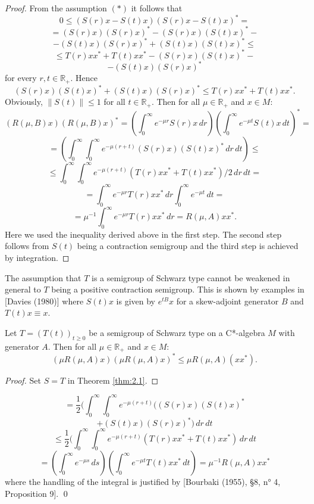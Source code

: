 \begin{proof}
From the assumption $ (*) $ it follows that
\[
0 \leq (S(r)x - S(t)x)(S(r)x - S(t)x)^* =
\]
\[
= (S(r)x)(S(r)x)^* - (S(r)x)(S(t)x)^* -
\]
\[
- (S(t)x)(S(r)x)^* + (S(t)x)(S(t)x)^* \leq
\]
\[
\leq T(r)xx^* + T(t)xx^* - (S(r)x)(S(t)x)^* -
\]
\[
- (S(t)x)(S(r)x)^*
\]
for every $ r,t \in \mathbb{R}_+ $.
Hence
\[
(S(r)x)(S(t)x)^* + (S(t)x)(S(r)x)^* \leq T(r)xx^* + T(t)xx^*.
\]
Obviously, $ \|S(t)\| \leq 1 $ for all $ t \in \mathbb{R}_+ $.
Then for all $ \mu \in \mathbb{R}_+ $ and $ x \in M $:
\[
(R(\mu,B)x)(R(\mu,B)x)^* = (\int_0^\infty e^{-\mu r}S(r)x \, dr)(\int_0^\infty e^{-\mu t}S(t)x \, dt)^* =
\]
\[
= (\int_0^\infty \int_0^\infty e^{-\mu(r+t)} (S(r)x)(S(t)x)^* \, dr \, dt) \leq
\]
\[
\leq \int_0^\infty \int_0^\infty e^{-\mu(r+t)} (T(r)xx^* + T(t)xx^*)/2 \, dr \, dt =
\]
\[
= \int_0^\infty e^{-\mu r} T(r)xx^* \, dr \int_0^\infty e^{-\mu t} \, dt =
\]
\[
= \mu^{-1} \int_0^\infty e^{-\mu r} T(r)xx^* \, dr = R(\mu,A)xx^*.
\]
Here we used the inequality derived above in the first step.
The second step follows from $ S(t)$ being a contraction semigroup and the third step is achieved by integration.
\end{proof}

\begin{remark}
The assumption that $ T $ is a semigroup of Schwarz type cannot be weakened in general to $ T $ being a positive contraction semigroup.
This is shown by examples in [Davies (1980)] where $ S(t)x $ is given by $ e^{tB}x $ for a skew-adjoint generator $ B $ and $ T(t)x \equiv x $.
\end{remark}

\begin{corollary}\label{cor:2.2}
Let $ T = (T(t))_{t\geq0} $ be a semigroup of Schwarz type on a C*-algebra $ M $ with generator $ A $.
Then for all $ \mu \in \mathbb{R}_+ $ and $ x \in M $:
\[
(\mu R(\mu,A)x)(\mu R(\mu,A)x)^* \leq \mu R(\mu,A)(xx^*).
\]
\end{corollary}

\begin{proof}
Set $ S = T $ in Theorem \ref{thm:2.1}.
\end{proof}
%

\[
= \frac{1}{2}(\int_0^\infty \int_0^\infty e^{-\mu(r+t)} ((S(r)x)(S(t)x)^*
\]
\[
+ (S(t)x)(S(r)x)^*) \, dr \, dt
\]
\[
\leq \frac{1}{2}(\int_0^\infty \int_0^\infty e^{-\mu(r+t)} (T(r)xx^* + T(t)xx^*) \, dr \, dt
\]
\[
= (\int_0^\infty e^{-\mu s} \, ds)(\int_0^\infty e^{-\mu t}T(t)xx^* \, dt) = \mu^{-1}R(\mu,A)xx^*
\]
where the handling of the integral is justified by [Bourbaki (1955), §8, n° 4, Proposition 9].
\qed

